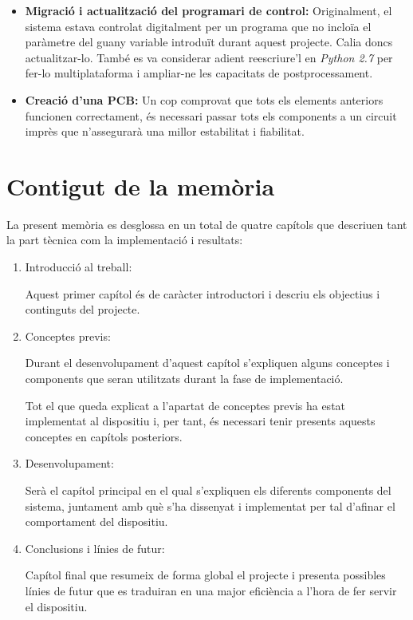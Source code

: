 \begin{itemize}
\begin{itemize}
	\end{itemize}
	
	\item{\textbf{Migració i actualització del programari de control: }}Originalment, el sistema estava controlat digitalment per un programa que no incloïa el paràmetre del guany variable introduït durant aquest projecte. Calia doncs actualitzar-lo. També es va considerar adient reescriure'l en \textit{Python \num{2.7}} per fer-lo multiplataforma i ampliar-ne les capacitats de postprocessament.
	
	\item{\textbf{Creació d'una \ac{PCB}: }}Un cop comprovat que tots els elements anteriors funcionen correctament, és necessari passar tots els components a un circuit imprès que n'assegurarà una millor estabilitat i fiabilitat.
		
\end{itemize}


\section{Contigut de la memòria}\label{sec:contingut_de_la_memoria}

La present memòria es desglossa en un total de quatre capítols que descriuen tant la part tècnica com la implementació i resultats:

\begin{enumerate}
	\item{Introducció al treball:}
	
	Aquest primer capítol és de caràcter introductori i descriu els objectius i continguts del projecte.
	
	\item{Conceptes previs:}
	
	Durant el desenvolupament d'aquest capítol s'expliquen alguns conceptes i components que seran utilitzats durant la fase de implementació.
	
	Tot el que queda explicat a l'apartat de conceptes previs ha estat implementat al dispositiu i, per tant, és necessari tenir presents aquests conceptes en capítols posteriors.
	
	\item{Desenvolupament:}
	
	Serà el capítol principal en el qual s'expliquen els diferents components del sistema, juntament amb què s'ha dissenyat i implementat per tal d'afinar el comportament del dispositiu.
	
	\item{Conclusions i línies de futur:}
	
	Capítol final que resumeix de forma global el projecte i presenta possibles línies de futur que es traduiran en una major eficiència a l'hora de fer servir el dispositiu.
	
\end{enumerate}